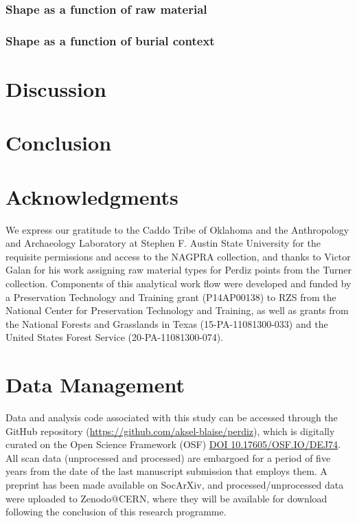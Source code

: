 \documentclass[review]{elsarticle}
\begin{document}
\subsubsection*{Shape as a function of raw material}



\subsubsection*{Shape as a function of burial context}



\section*{Discussion}



\section*{Conclusion}



\section*{Acknowledgments}

We express our gratitude to the Caddo Tribe of Oklahoma and the Anthropology and Archaeology Laboratory at Stephen F. Austin State University for the requisite permissions and access to the NAGPRA collection, and thanks to Victor Galan for his work assigning raw material types for Perdiz points from the Turner collection. Components of this analytical work flow were developed and funded by a Preservation Technology and Training grant (P14AP00138) to RZS from the National Center for Preservation Technology and Training, as well as grants from the National Forests and Grasslands in Texas (15-PA-11081300-033) and the United States Forest Service (20-PA-11081300-074).

\section*{Data Management}

Data and analysis code associated with this study can be accessed through the GitHub repository (\href{https://github.com/aksel-blaise/perdiz}{https://github.com/aksel-blaise/perdiz}), which is digitally curated on the Open Science Framework (OSF) \href{https://osf.io/dej74/}{DOI 10.17605/OSF.IO/DEJ74}. All scan data (unprocessed and processed) are embargoed for a period of five years from the date of the last manuscript submission that employs them. A preprint has been made available on SocArXiv, and processed/unprocessed data were uploaded to Zenodo@CERN, where they will be available for download following the conclusion of this research programme.
\end{document}
